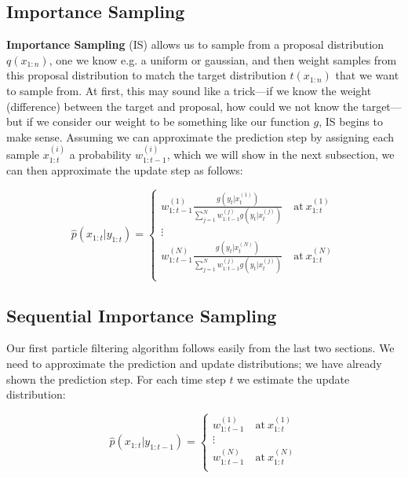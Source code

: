 \documentclass{article}
\begin{document}
\subsection{Importance Sampling}
\textbf{Importance Sampling} (IS) allows us to sample from a proposal distribution $q(x_{1:n})$, one we know e.g. a uniform or gaussian, and then weight samples from this proposal distribution to match the target distribution $t(x_{1:n})$ that we want to sample from. At first, this may sound like a trick---if we know the weight (difference) between the target and proposal, how could we not know the target---but if we consider our weight to be something like our function $g$, IS begins to make sense. Assuming we can approximate the prediction step by assigning each sample $x_{1:t}^{(i)}$ a probability $w_{1:t-1}^{(i)}$, which we will show in the next subsection, we can then approximate the update step as follows:

\begin{equation}
\widehat{p}(x_{1:t}|y_{1:t}) = \begin{cases}
w_{1:t-1}^{(1)}\frac{g(y_{t}|x_{t}^{(1)})}{\sum_{j=1}^N w_{1:t-1}^{(j)}g(y_{t}|x_{t}^{(j)})} \quad \text{at} \ x_{1:t}^{(1)} \\
\vdots \\
w_{1:t-1}^{(N)}\frac{g(y_{t}|x_{t}^{(N)})}{\sum_{j=1}^N w_{1:t-1}^{(j)}g(y_{t}|x_{t}^{(j)})} \quad \text{at} \ x_{1:t}^{(N)} \\
\end{cases}
\end{equation}

\subsection{Sequential Importance Sampling}
Our first particle filtering algorithm follows easily from the last two sections. We need to approximate the prediction and update distributions; we have already shown the prediction step. For each time step $t$ we estimate the update distribution:

\begin{equation}
\widehat{p}(x_{1:t}|y_{1:t-1}) = \begin{cases}
w_{1:t-1}^{(1)} \quad \text{at} \ x_{1:t}^{(1)} \\
\vdots \\
w_{1:t-1}^{(N)} \quad \text{at} \ x_{1:t}^{(N)} \\
\end{cases}
\end{equation}
\end{document}
